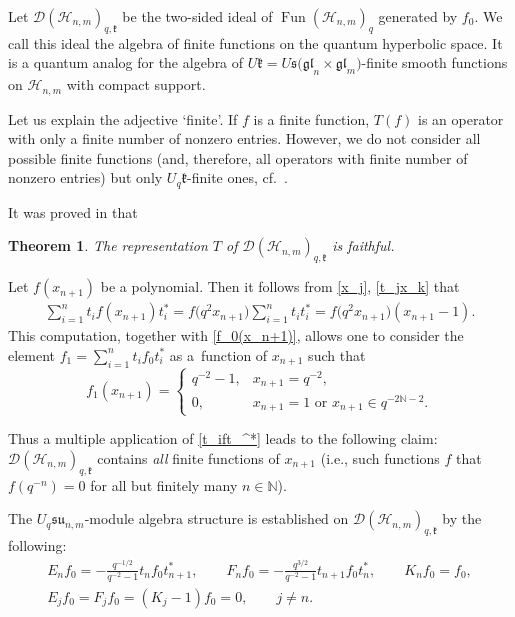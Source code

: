 \documentclass[11pt]{article}
\newtheorem{theorem}{Theorem}
\begin{document}
Let $\mathscr{D}(\mathscr{H}_{n,m})_{q,\mathfrak{k}}$ be the two-sided ideal of
$\operatorname{Fun}(\mathscr{H}_{n,m})_q$ generated by $f_0$. We call this ideal the algebra of f\/inite
functions on the quantum hyperbolic space. It is a quantum analog for the algebra of $U \mathfrak{k}=U
\mathfrak{s(gl}_n \times \mathfrak{gl}_m)$-f\/inite smooth functions on $\mathscr{H}_{n,m}$ with compact
support.

\begin{remark}
Let us explain the adjective `f\/inite'. If $f$ is a f\/inite function, $T(f)$ is an operator with only a f\/inite
number of nonzero entries. However, we do not consider all possible f\/inite functions (and, therefore, all
operators with f\/inite number of nonzero entries) but only $U_q \mathfrak{k}$-f\/inite ones, cf.~\cite{Faraut}.
\end{remark}

It was proved in \cite{BS} that

\begin{theorem}
The representation $T$ of $\mathscr{D}(\mathscr{H}_{n,m})_{q,\mathfrak{k}}$ is faithful.
\end{theorem}

\begin{remark}\label{remark2}
Let $f(x_{n+1})$ be a polynomial. Then it follows from \eqref{x_j}, \eqref{t_jx_k} that
\begin{gather}\label{t_ift_^*}
\sum_{i=1}^nt_if(x_{n+1})t_i^*=f\big(q^2x_{n+1}\big)\sum_{i=1}^nt_it_i^*= f\big(q^2x_{n+1}\big)(x_{n+1}-1).
\end{gather}
This computation, together with \eqref{f_0(x_n+1)}, allows one to consider the element
$f_1=\sum\limits_{i=1}^nt_if_0t_i^*$ as a~function of $x_{n+1}$ such that
\[
f_1(x_{n+1})=
\begin{cases}
q^{-2}-1, & x_{n+1}=q^{-2},
\\ 0, & x_{n+1}=1\text{ \ or \ }x_{n+1}\in q^{-2\mathbb{N}-2}.
\end{cases}
\]

Thus a multiple application of \eqref{t_ift_^*} leads to the following claim:
$\mathscr{D}(\mathscr{H}_{n,m})_{q,\mathfrak{k}}$ contains {\it all} f\/inite functions of $x_{n+1}$ (i.e.,
such functions $f$ that $f(q^{-n})=0$ for all but f\/initely many $n\in\mathbb{N}$).
\end{remark}

The $U_{q}\mathfrak{su}_{n,m}$-module algebra structure is established on
$\mathscr{D}(\mathscr{H}_{n,m})_{q,\mathfrak{k}}$ by the following:
\begin{gather*}
E_nf_0 = -\frac{q^{-1/2}}{q^{-2}-1}t_nf_0t_{n+1}^*, \qquad F_nf_0 = -\frac{q^{3/2}}{q^{-2}-1}t_{n+1}f_0t_n^*,
\qquad K_nf_0 = f_0,
\\
E_jf_0 = F_jf_0=(K_j-1)f_0=0,\qquad j\ne n.
\end{gather*}
\end{document}
